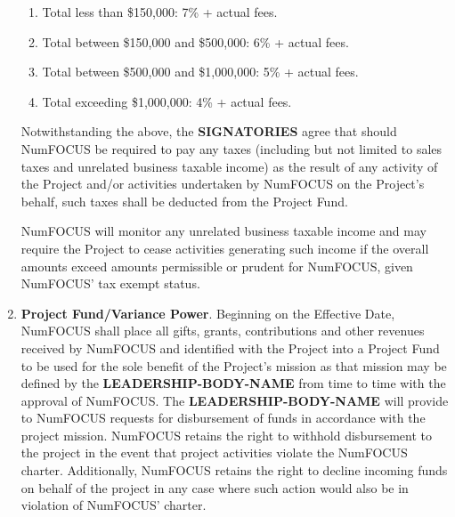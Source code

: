 \documentclass[english,letterpaper,12pt]{article}
\newcommand{\signatories}{\textbf{SIGNATORIES}}
\newcommand{\leadershipbody}{\textbf{LEADERSHIP-BODY-NAME}}
\begin{document}
\begin{enumerate}[label=\arabic*.,ref=\S~\arabic*]
\begin{enumerate}

\item Total less than \$150,000: 7\% + actual fees.

\item Total between \$150,000 and \$500,000: 6\% + actual fees.

\item Total between \$500,000 and \$1,000,000: 5\% + actual fees.

\item Total exceeding \$1,000,000: 4\% + actual fees.

\end{enumerate}


Notwithstanding the above, the \signatories{} agree that should NumFOCUS
be required to pay any taxes (including but not limited to sales taxes
and unrelated business taxable income) as the result of any activity
of the Project and/or activities undertaken by NumFOCUS on the
Project's behalf, such taxes shall be deducted from the Project Fund.

NumFOCUS will monitor any unrelated business taxable income and
may require the Project to cease activities generating such income
if the overall amounts exceed amounts permissible or prudent for NumFOCUS,
given NumFOCUS' tax exempt status.

\item \textbf{Project Fund/Variance Power}. Beginning on the Effective Date,
  NumFOCUS shall place all gifts, grants, contributions and other revenues
  received by NumFOCUS and identified with the Project into a Project Fund to
  be used for the sole benefit of the Project's mission as that mission may be
  defined by the \leadershipbody{} from time to time with the approval of
  NumFOCUS. The \leadershipbody{} will provide to NumFOCUS requests for
  disbursement of funds in accordance with the project mission. NumFOCUS
  retains the right to withhold disbursement to the project in the event that
  project activities violate the NumFOCUS charter.  Additionally, NumFOCUS
  retains the right to decline incoming funds on behalf of the project in any
  case where such action would also be in violation of NumFOCUS' charter.


\end{enumerate}
\end{document}
